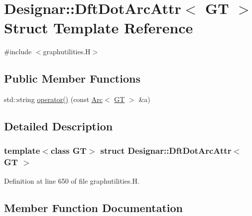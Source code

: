 \hypertarget{struct_designar_1_1_dft_dot_arc_attr}{}\section{Designar\+:\+:Dft\+Dot\+Arc\+Attr$<$ GT $>$ Struct Template Reference}
\label{struct_designar_1_1_dft_dot_arc_attr}


{\ttfamily \#include $<$graphutilities.\+H$>$}

\subsection*{Public Member Functions}
\begin{DoxyCompactItemize}
\item 
std\+::string \hyperlink{struct_designar_1_1_dft_dot_arc_attr_ab98550f41b109bbd2d479355ad9de769}{operator()} (const \hyperlink{namespace_designar_a3f55fb5513d62ff47cbc8f72b8e95d6f}{Arc}$<$ \hyperlink{demo-buildgraph_8_c_a3001c40d2c31ca87ed96cd7d1334a55e}{GT} $>$ \&a)
\end{DoxyCompactItemize}


\subsection{Detailed Description}
\subsubsection*{template$<$class GT$>$\newline
struct Designar\+::\+Dft\+Dot\+Arc\+Attr$<$ G\+T $>$}



Definition at line 650 of file graphutilities.\+H.



\subsection{Member Function Documentation}
\mbox{\label{struct_designar_1_1_dft_dot_arc_attr_ab98550f41b109bbd2d479355ad9de769}} 
